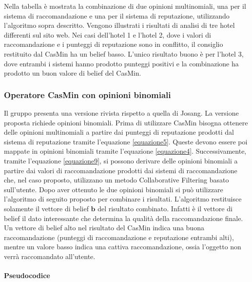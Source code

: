 \documentclass{report}
\newcommand{\myparagraph}[1]{\paragraph{#1}\mbox{} \mbox{}}
\begin{document}
	Nella tabella
	è mostrata la combinazione di due opinioni multinomiali, una per il
	sistema di raccomandazione e una per il sistema di reputazione,
	utilizzando l'algoritmo sopra descritto. Vengono illustrati i risultati
	di analisi di tre hotel differenti sul sito web. Nei casi dell'hotel 1 e
	l'hotel 2, dove i valori di raccomandazione e i punteggi di reputazione
	sono in conflitto, il consiglio restituito dal CasMin ha un belief
	basso. L'unico risultato buono è per l'hotel 3, dove entrambi i sistemi
	hanno prodotto punteggi positivi e la combinazione ha prodotto un buon
	valore di belief del CasMin.
	
	\hypertarget{header-n192}{%
		\subsubsection{Operatore CasMin con opinioni
			binomiali}\label{header-n192}}
	
	Il gruppo presenta una versione rivista rispetto a quella di Josang. La
	versione proposta richiede opinioni binomiali. Prima di utilizzare
	CasMin bisogna ottenere delle opinioni multinomiali a partire dai punteggi
	di reputazione prodotti dal sistema di reputazione tramite l'equazione \eqref{equazione5}. Queste devono essere poi
	mappate in opinioni binomiali tramite l'equazione \eqref{equazione4}. Successivamente, tramite l'equazione \eqref{equazione9},
	si possono derivare delle opinioni binomiali a partire dai valori di raccomandazione prodotti dai sistemi di raccomandazione
	che, nel caso proposto, utilizzano un metodo Collaborative Filtering
	basato sull'utente. Dopo aver ottenuto le due
	opinioni binomiali si può utilizzare l'algoritmo di seguito proposto per
	combinare i risultati. L'algoritmo restituisce solamente il vettore di
	belief $\textbf{b}$ del risultato combinato. Infatti è il vettore di
	belief il dato interessante che determina la qualità della
	raccomandazione finale. Un vettore di belief alto nel risultato del CasMin indica una
	buona raccomandazione (punteggi di raccomandazione e reputazione entrambi alti),
	mentre un valore basso indica una cattiva raccomandazione, ossia
	l'oggetto non verrà raccomandato all'utente.
	
	\hypertarget{header-n195}{%
		\myparagraph{Pseudocodice}\label{header-n195}}
	
\end{document}
